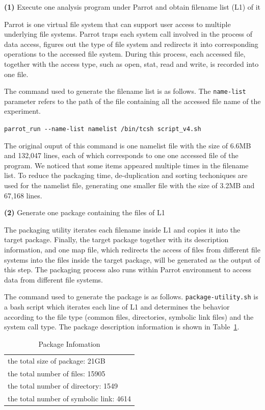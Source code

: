 \documentclass{sig-alternate}
\begin{document}
{\bf(1)} Execute one analysis program under Parrot and obtain filename list (L1) of it

Parrot is one virtual file system that can support user access to multiple
underlying file systems. Parrot traps each system call involved in the process
of data access, figures out the type of file system and redirects it into
corresponding operations to the accessed file system. During this process, each
accessed file, together with the access type, such as
open, stat, read and write, is recorded into one file.

The command used to generate the filename list is as follows. The {\tt name-list} parameter refers to the path of the file containing all the accessed file name of the experiment.

{\tt parrot\_run \texttt{-{}-}name-list namelist /bin/tcsh script\_v4.sh}

The original ouput of this command is one namelist file with the size of 6.6MB
and 132,047 lines, each of which corresponds to one one accessed file of the
program. We noticed that some items appeared multiple times in the filename list. To reduce the
packaging time, de-duplication and sorting techoniques are used for the
namelist file, generating one smaller file with the size of 3.2MB and 67,168 lines.

{\bf (2)} Generate one package containing the files of L1 

The packaging utility iterates each filename inside L1 and copies it into the
target package. Finally, the target package
together with its description information, and one map file, which redirects
the access of files from different file systems into the files inside the target package, will be
generated as the output of this step. The packaging process also runs within Parrot environment to
access data from different file systems.

The command used to generate the package is as follows. 
{\tt package-utility.sh} is a bash script which iterates each line of L1 and
determines the behavior according to the file type (common files, directories,
symbolic link files) and the system call type.
The package description information is shown in Table~\ref{table:package-info}.

\begin{table}
    \centering
    \begin{tabular}{|l|}
    \hline
     the total size of package: 21GB \\ 
    the total number of files: 15905\\ 
    the total number of directory: 1549\\ 
    the total number of symbolic link: 4614 \\ \hline 
    \end{tabular}
    \caption{Package Infomation}
    \label{table:package-info}
\end{table}
\end{document}
